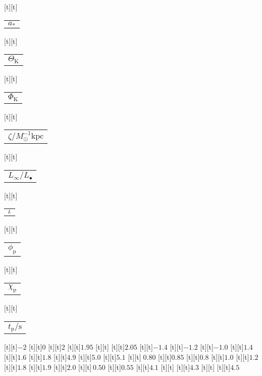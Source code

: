 \begin{psfrags}
[t][t]{\color[rgb]{0,0,0}\setlength{\tabcolsep}{0pt}\begin{tabular}{c}{$a_\ast$}\end{tabular}}%
[t][t]{\color[rgb]{0,0,0}\setlength{\tabcolsep}{0pt}\begin{tabular}{c}{$\Theta_\mathrm{K}$}\end{tabular}}%
[t][t]{\color[rgb]{0,0,0}\setlength{\tabcolsep}{0pt}\begin{tabular}{c}{$\Phi_\mathrm{K}$}\end{tabular}}%
[t][t]{\color[rgb]{0,0,0}\setlength{\tabcolsep}{0pt}\begin{tabular}{c}{$\zeta/M_\odot^{-1} \mathrm{kpc}$}\end{tabular}}%
[t][t]{\color[rgb]{0,0,0}\setlength{\tabcolsep}{0pt}\begin{tabular}{c}{$L_\infty/L_\bullet$}\end{tabular}}%
[t][t]{\color[rgb]{0,0,0}\setlength{\tabcolsep}{0pt}\begin{tabular}{c}{$\iota$}\end{tabular}}%
[t][t]{\color[rgb]{0,0,0}\setlength{\tabcolsep}{0pt}\begin{tabular}{c}{$\phi_\mathrm{p}$}\end{tabular}}%
[t][t]{\color[rgb]{0,0,0}\setlength{\tabcolsep}{0pt}\begin{tabular}{c}{$\chi_\mathrm{p}$}\end{tabular}}%
[t][t]{\color[rgb]{0,0,0}\setlength{\tabcolsep}{0pt}\begin{tabular}{c}{$t_\mathrm{p}/\mathrm{s}$}\end{tabular}}%
%
[t][t]{$-2$}%
[t][t]{$0$}%
[t][t]{$2$}%
[t][t]{$1.95$}%
[t][t]{}%
[t][t]{$2.05$}%
[t][t]{$-1.4$}%
[t][t]{$-1.2$}%
[t][t]{$-1.0$}%
[t][t]{$1.4$}%
[t][t]{$1.6$}%
[t][t]{$1.8$}%
[t][t]{$4.9$}%
[t][t]{$5.0$}%
[t][t]{$5.1$}%
[t][t]{$\;0.80$}%
[t][t]{$0.85$}%
[t][t]{$0.8$}%
[t][t]{$1.0$}%
[t][t]{$1.2$}%
[t][t]{$1.8$}%
[t][t]{$1.9$}%
[t][t]{$2.0$}%
[t][t]{$\,0.50$}%
[t][t]{$0.55$}%
[t][t]{$4.1$}%
[t][t]{}%
[t][t]{$4.3$}%
[t][t]{}%
[t][t]{$4.5$}%

\end{psfrags}
